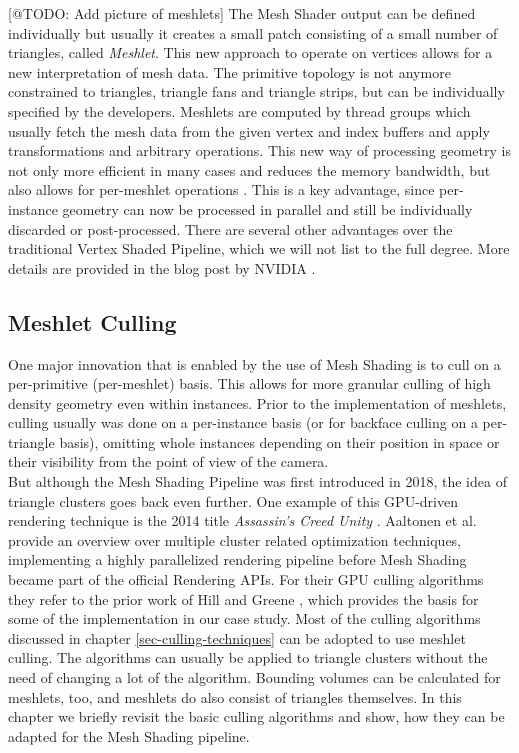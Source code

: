 [@TODO: Add picture of meshlets]
\noindent
The Mesh Shader output can be defined individually but usually it creates a small patch consisting of a small 
number of triangles, called \emph{Meshlet}. This new approach to operate on vertices allows for a new interpretation 
of mesh data. The primitive topology is not anymore constrained to triangles, triangle fans and triangle strips, 
but can be individually specified by the developers.
Meshlets are computed by thread groups which usually fetch the mesh data from the given vertex and index buffers and 
apply transformations and arbitrary operations. This new way of processing geometry is not only more efficient in many 
cases and reduces the memory bandwidth, but also allows for per-meshlet operations \cite{Kubisch2020}. This is a key 
advantage, since per-instance geometry can now be processed in parallel and still be individually discarded or post-processed. 
There are several other advantages over the traditional Vertex Shaded Pipeline, which we will not list to the full 
degree. More details are provided in the blog post by NVIDIA \cite{Kubisch2020}.\\


\subsection{Meshlet Culling} \label{subsec-meshlet-culling}

One major innovation that is enabled by the use of Mesh Shading is to cull on a per-primitive (per-meshlet) basis. 
This allows for more granular culling of high density geometry even within instances. Prior to the implementation 
of meshlets, culling usually was done on a per-instance basis (or for backface culling on a per-triangle basis), 
omitting whole instances depending on their position in space or their visibility from the point of view of the camera.\\

\noindent
But although the Mesh Shading Pipeline was first introduced in 2018, the idea of triangle clusters goes back even further.
One example of this \ac{GPU}-driven rendering technique is the 2014 title \emph{Assassin's Creed Unity} \cite{Ubisoft2014}.
Aaltonen et al. \cite{Aaltonen2015} provide an overview over multiple cluster related optimization techniques, implementing 
a highly parallelized rendering pipeline before Mesh Shading became part of the official Rendering \ac{API}s.
For their \ac{GPU} culling algorithms they refer to the prior work of Hill \cite{Hill11} and Greene \cite{Greene93}, which 
provides the basis for some of the implementation in our case study. Most of the culling algorithms discussed in chapter 
\ref{sec-culling-techniques} can be adopted to use meshlet culling. The algorithms can usually be applied to triangle clusters 
without the need of changing a lot of the algorithm. Bounding volumes can be calculated for meshlets, too, and meshlets do also 
consist of triangles themselves. In this chapter we briefly revisit the basic culling algorithms and show, how they can be 
adapted for the Mesh Shading pipeline.

